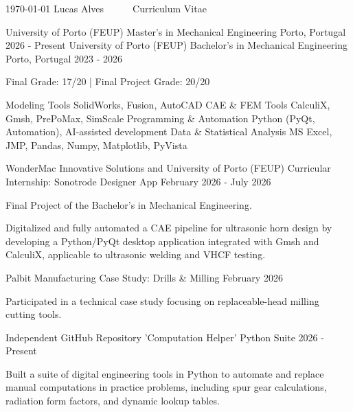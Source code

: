 \documentclass[11pt, a4paper]{awesome-cv}
\begin{document}
\makecvheader

\makecvfooter
  {\today}
  {Lucas Alves~~~\textbar~~~Curriculum Vitae}
  {\thepage}


\begin{cventries}
  \cventry
    {University of Porto (FEUP)}
    {Master's in Mechanical Engineering}
    {Porto, Portugal}
    {2026 - Present}
    {}
  \cventry
    {University of Porto (FEUP)}
    {Bachelor's in Mechanical Engineering}
    {Porto, Portugal}
    {2023 - 2026}
    {\begin{cvitems}
      \item {Final Grade: 17/20 | Final Project Grade: 20/20}
    \end{cvitems}}
\end{cventries}

\begin{cvskills}
  \cvskill
    {Modeling Tools}
    {SolidWorks, Fusion, AutoCAD}
  \cvskill
    {CAE \& FEM Tools}
    {CalculiX, Gmsh, PrePoMax, SimScale}
  \cvskill
    {Programming \& Automation}
    {Python (PyQt, Automation), AI-assisted development}
  \cvskill
    {Data \& Statistical Analysis}
    {MS Excel, JMP, Pandas, Numpy, Matplotlib, PyVista}
\end{cvskills}

\begin{cventries}
  \cventry
    {WonderMac Innovative Solutions and University of Porto (FEUP)}
    {Curricular Internship: Sonotrode Designer App}
    {}
    {February 2026 - July 2026}
    {\begin{cvitems}
      \item {Final Project of the Bachelor's in Mechanical Engineering.}
      \item {Digitalized and fully automated a CAE pipeline for ultrasonic horn design by developing a Python/PyQt desktop application integrated with Gmsh and CalculiX, applicable to ultrasonic welding and VHCF testing.}
    \end{cvitems}}
  \cventry
    {Palbit}
    {Manufacturing Case Study: Drills \& Milling}
    {}
    {February 2026}
    {\begin{cvitems}
      \item {Participated in a technical case study focusing on replaceable-head milling cutting tools.}
    \end{cvitems}}
  \cventry
    {Independent GitHub Repository}
    {'Computation Helper' Python Suite}
    {}
    {2026 - Present}
    {\begin{cvitems}
      \item {Built a suite of digital engineering tools in Python to automate and replace manual computations in practice problems, including spur gear calculations, radiation form factors, and dynamic lookup tables.}
    \end{cvitems}}
\end{cventries}
\end{document}
